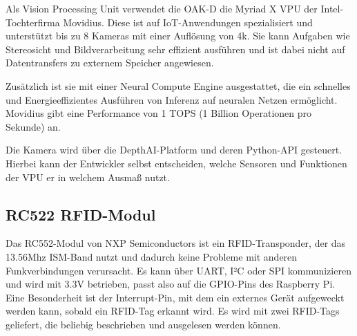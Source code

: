 Als Vision Processing Unit verwendet die OAK-D die Myriad X \ac{VPU} der Intel-Tochterfirma Movidius. Diese ist auf IoT-Anwendungen spezialisiert und unterstützt bis zu 8 Kameras mit einer Auflösung von 4k. Sie kann Aufgaben wie Stereosicht und Bildverarbeitung sehr effizient ausführen und ist dabei nicht auf Datentransfers zu externem Speicher angewiesen.

Zusätzlich ist sie mit einer Neural Compute Engine ausgestattet, die ein schnelles und Energieeffizientes Ausführen von Inferenz auf neuralen Netzen ermöglicht. Movidius gibt eine Performance von 1 TOPS (1 Billion Operationen pro Sekunde) an.

Die Kamera wird über die DepthAI-Platform und deren Python-API gesteuert. Hierbei kann der Entwickler selbst entscheiden, welche Sensoren und Funktionen der VPU er in welchem Ausmaß nutzt.\autocite[Vgl.][]{oakd}

\subsection{RC522 RFID-Modul}

Das RC552-Modul von NXP Semiconductors ist ein RFID-Transponder, der das 13.56Mhz ISM-Band nutzt und dadurch keine Probleme mit anderen Funkverbindungen verursacht. Es kann über UART, I²C oder SPI kommunizieren und wird mit 3.3V betrieben, passt also auf die \ac{GPIO}-Pins des Raspberry Pi. Eine Besonderheit ist der Interrupt-Pin, mit dem ein externes Gerät aufgeweckt werden kann, sobald ein RFID-Tag erkannt wird. Es wird mit zwei RFID-Tags geliefert, die beliebig beschrieben und ausgelesen werden können. 


